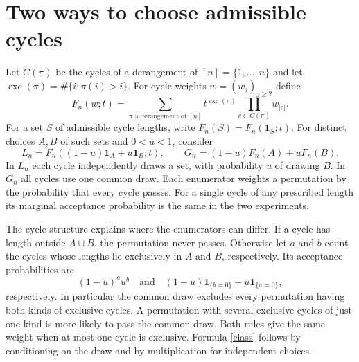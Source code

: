 \documentclass[10pt,a4paper]{article}
\newcommand{\exc}{\operatorname{exc}}
\begin{document}
\section{Two ways to choose admissible cycles}
Let $C(\pi)$ be the cycles of a derangement of $[n]=\{1,\ldots,n\}$ and let $\exc(\pi)=\#\{i:\pi(i)>i\}$. For cycle weights $w=(w_j)_{j\ge2}$ define
\[
 F_n(w;t)=\sum_{\pi\text{ a derangement of }[n]}t^{\exc(\pi)}
                  \prod_{c\in C(\pi)} w_{|c|}.
\]
For a set $S$ of admissible cycle lengths, write $F_n(S)=F_n(\mathbf1_S;t)$. For distinct choices $A,B$ of such sets and $0<u<1$, consider
\[
 L_n=F_n((1-u)\mathbf1_A+u\mathbf1_B;t),\qquad
 G_n=(1-u)F_n(A)+u F_n(B).
\]
In $L_n$ each cycle independently draws a set, with probability $u$ of drawing $B$. In $G_n$ all cycles use one common draw. Each enumerator weights a permutation by the probability that every cycle passes. For a single cycle of any prescribed length its marginal acceptance probability is the same in the two experiments.

The cycle structure explains where the enumerators can differ. If a cycle has length outside $A\cup B$, the permutation never passes. Otherwise let $a$ and $b$ count the cycles whose lengths lie exclusively in $A$ and $B$, respectively. Its acceptance probabilities are
\begin{equation}\label{class}
 (1-u)^a u^b\quad\text{and}\quad
 (1-u)\mathbf1_{\{b=0\}}+u\mathbf1_{\{a=0\}},
\end{equation}
respectively. In particular the common draw excludes every permutation having both kinds of exclusive cycles. A permutation with several exclusive cycles of just one kind is more likely to pass the common draw. Both rules give the same weight when at most one cycle is exclusive. Formula \eqref{class} follows by conditioning on the draw and by multiplication for independent choices.
\end{document}
